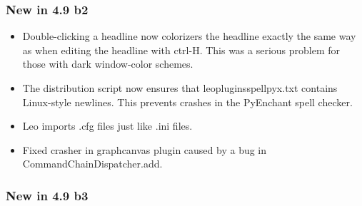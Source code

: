 \documentclass[a4paper,10pt,english]{sphinxmanual}
\begin{document}
\subsubsection{New in 4.9 b2}
\label{what-is-new:new-in-4-9-b2}\begin{itemize}
\item {} 
Double-clicking a headline now colorizers the headline exactly the same way as
when editing the headline with ctrl-H. This was a serious problem for those
with dark window-color schemes.

\item {} 
The distribution script now ensures that leopluginsspellpyx.txt contains
Linux-style newlines. This prevents crashes in the PyEnchant spell checker.

\item {} 
Leo imports .cfg files just like .ini files.

\item {} 
Fixed crasher in graphcanvas plugin caused by a bug in CommandChainDispatcher.add.

\end{itemize}


\subsubsection{New in 4.9 b3}
\label{what-is-new:new-in-4-9-b3}
\end{document}
